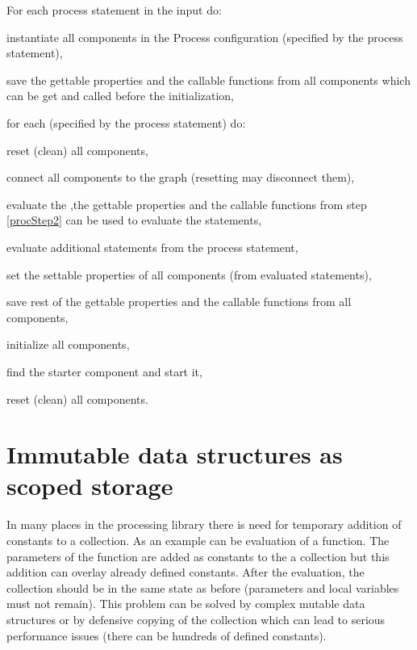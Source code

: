 For each process statement in the input do:
\begin{enumerate*}
	\item instantiate all components in the Process configuration (specified by the process statement),
	\item \label{procStep2} save the gettable properties and the callable functions from all components which can be get and called before the initialization,
	\item for each \lsystem (specified by the process statement) do:
	\begin{enumerate*}
		\item reset (clean) all components,
		\item connect all components to the graph (resetting may disconnect them),
		\item evaluate the \lsystem,the  gettable properties and the callable functions from step \ref{procStep2} can be used to evaluate the \lsystem statements,
		\item evaluate additional \lsystem statements from the process statement,
		\item set the settable properties of all components (from evaluated \lsystem statements),
		\item save rest of the gettable properties and the callable functions from all components,
		\item initialize all components,
		\item find the starter component and start it,
	\end{enumerate*}
	\item reset (clean) all components.
\end{enumerate*}


\section{Immutable data structures as scoped storage}
\label{sec:immutableDs}

In many places in the \lsystem processing library there is need for temporary addition of constants to a collection.
As an example can be evaluation of a function.
The parameters of the function are added as constants to the a collection but this addition can overlay already defined constants.
After the evaluation, the collection should be in the same state as before (parameters and local variables must not remain).
This problem can be solved by complex mutable data structures or by defensive copying of the collection which can lead to serious performance issues (there can be hundreds of defined constants).

